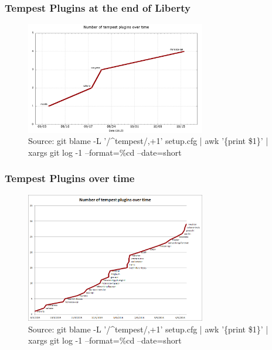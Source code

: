\documentclass[aspectratio=169,11pt,hyperref={colorlinks=true}]{beamer}
\begin{document}
\begin{frame}
    \frametitle{Tempest Plugins at the end of Liberty}
    \begin{figure}[p]
    	\centering
    	\includegraphics[width=0.7\textwidth]{tempest-plugins-old.png}
        \caption{Source: git blame -L '/\^{}tempest/,+1' setup.cfg | awk '\{print \$1\}' | xargs git log -1 --format=\%cd --date=short}
    \end{figure}
\end{frame}

\begin{frame}
    \frametitle{Tempest Plugins over time}
    \begin{figure}[p]
    	\centering
    	\includegraphics[width=0.7\textwidth]{tempest-plugins.png}
        \caption{Source: git blame -L '/\^{}tempest/,+1' setup.cfg | awk '\{print \$1\}' | xargs git log -1 --format=\%cd --date=short}
    \end{figure}
\end{frame}
\end{document}
